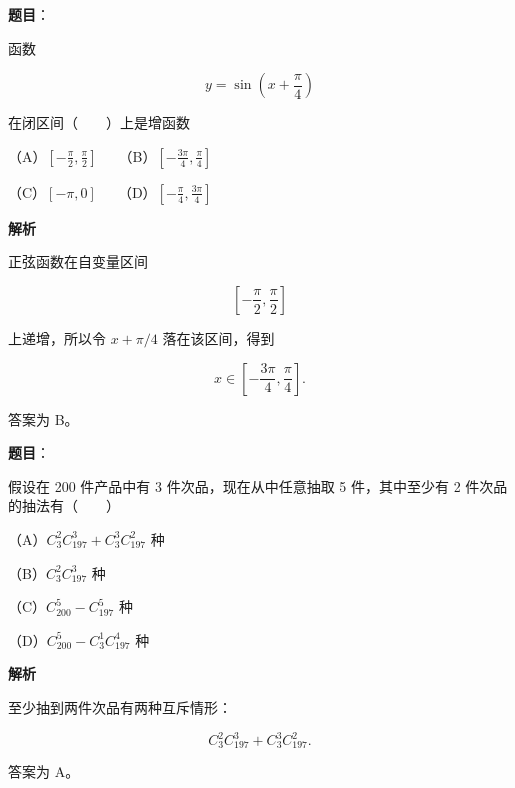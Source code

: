 \begin{answer}

\textbf{题目}：

函数

\nopagebreak[4]
\[
y=\sin\left(x+\frac\pi4\right)
\]

在闭区间\mbox{（　　）}上是增函数

（A）$\left[-\frac\pi2,\frac\pi2\right]$　　（B）$\left[-\frac{3\pi}{4},\frac\pi4\right]$

（C）$[-\pi,0]$　　（D）$\left[-\frac\pi4,\frac{3\pi}{4}\right]$

\textbf{解析}

正弦函数在自变量区间

\nopagebreak[4]
\[
\left[-\frac\pi2,\frac\pi2\right]
\]

上递增，所以令 $x+\pi/4$ 落在该区间，得到

\nopagebreak[4]
\[
x\in\left[-\frac{3\pi}{4},\frac\pi4\right].
\]

答案为 B。


\end{answer}
\begin{answer}

\textbf{题目}：

假设在 200 件产品中有 3 件次品，现在从中任意抽取 5 件，其中至少有 2 件次品的抽法有\mbox{（　　）}

（A）$C_3^2C_{197}^3+C_3^3C_{197}^2$ 种

（B）$C_3^2C_{197}^3$ 种

（C）$C_{200}^5-C_{197}^5$ 种

（D）$C_{200}^5-C_3^1C_{197}^4$ 种

\textbf{解析}

至少抽到两件次品有两种互斥情形：

\nopagebreak[4]
\[
C_3^2C_{197}^3+C_3^3C_{197}^2.
\]

答案为 A。


\end{answer}
